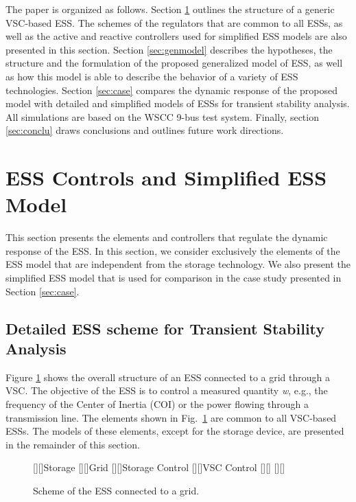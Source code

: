 \documentclass[journal, a4paper]{IEEEtran}
\begin{document}
The paper is organized as follows.  Section \ref{sec:overview}
outlines the structure of a generic VSC-based ESS.  The schemes of the
regulators that are common to all ESSs, as well as the active and
reactive controllers used for simplified ESS models are also presented
in this section.  Section \ref{sec:genmodel} describes the hypotheses,
the structure and the formulation of the proposed generalized model of
ESS, as well as how this model is able to describe the behavior of a
variety of ESS technologies.  Section \ref{sec:case} compares the
dynamic response of the proposed model with detailed and simplified
models of ESSs for transient stability
analysis. All simulations are based on the WSCC 9-bus
test system.
Finally, section \ref{sec:conclu} draws conclusions and outlines
future work directions.



\section{ESS Controls and Simplified ESS Model}
\label{sec:overview}

This section presents the elements and controllers that regulate the
dynamic response of the ESS.  In this section, we consider exclusively
the elements of the ESS model that are independent from the storage
technology.  We also present the simplified ESS model that is used for
comparison in the case study presented in Section \ref{sec:case}.
\vspace{-2.5mm}
\subsection{Detailed ESS scheme for Transient Stability Analysis}
\label{subsec:ESSscheme}

Figure \ref{ess+vsc} shows the overall structure of an ESS connected
to a grid through a VSC.  The objective of
the ESS is to control a measured quantity {\it w}, e.g., the frequency
of the Center of Inertia (COI) or the power flowing through a
transmission line.  The elements shown in Fig.~\ref{ess+vsc}
are common to all VSC-based ESSs.  The models
of these elements, except for the storage device,
are presented in the remainder of this section.

\begin{figure}[h!]
  \begin{center}
    [][]{\LARGE{Storage}}
    [][]{\LARGE{Grid}}
    [][]{\Large{Storage Control}}
    [][]{\Large{VSC Control}}
    \psfrag{+}[][]{\Large{}}
    \psfrag{-}[][]{\Large{}}
    \caption{Scheme of the ESS connected to a grid.}
    \label{ess+vsc}
  \end{center}
  \vspace{-0.2cm}
\end{figure}
\end{document}

